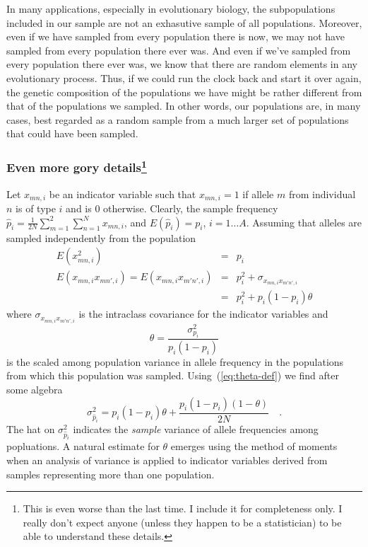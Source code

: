 In many applications, especially in evolutionary biology, the
subpopulations included in our sample are not an exhasutive sample of
all populations. Moreover, even if we have sampled from every
population there is now, we may not have sampled from every population
there ever was. And even if we've sampled from every population there
ever was, we know that there are random elements in any evolutionary
process. Thus, if we could run the clock back and start it over again,
the genetic composition of the populations we have might be rather
different from that of the populations we sampled. In other words, our
populations are, in many cases, best regarded as a random sample from
a much larger set of populations that could have been
sampled.

\subsubsection*{Even more gory details\footnote{This is even worse
    than the last time. I include it for completeness only. I really
    don't expect anyone (unless they happen to be a statistician) to
    be able to understand these details.}}

Let $x_{mn,i}$ be an indicator variable such that $x_{mn,i} = 1$ if
allele $m$ from individual $n$ is of type $i$ and is 0
otherwise. Clearly, the sample frequency $\hat p_i =
\frac{1}{2N}\sum_{m=1}^2\sum_{n=1}^Nx_{mn,i}$, and $E(\hat p_i) =
p_i$, $i=1\dots A$. Assuming that alleles are sampled independently
from the population
\begin{eqnarray*}
E(x^2_{mn,i}) &=& p_i \\
E(x_{mn,i}x_{mn',i}) = E(x_{mn,i}x_{m'n',i}) &=& p_i^2 + \sigma_{x_{mn,i}x_{m'n',i}} \\
&=& p_i^2 + p_i(1-p_i)\theta
\end{eqnarray*}
where $\sigma_{x_{mn,i}x_{m'n',i}}$ is the intraclass covariance for
the indicator variables and
\begin{equation}
\theta = \frac{\sigma^2_{p_i}}{p_i(1-p_i)} \label{eq:theta-def}
\end{equation}
is the scaled among population variance in allele frequency in the
populations from which this population was
sampled. Using~(\ref{eq:theta-def}) we find after some algebra
\[
\sigma^2_{\hat p_i} = p_i(1-p_i)\theta +
\frac{p_i(1-p_i)(1-\theta)}{2N} \quad .
\]
The hat on $\sigma^2_{\hat p_i}$ indicates the {\it sample\/} variance
of allele frequencies among popluations. A natural estimate for
$\theta$ emerges using the method of moments when an analysis of
variance is applied to indicator variables derived from samples
representing more than one population.

